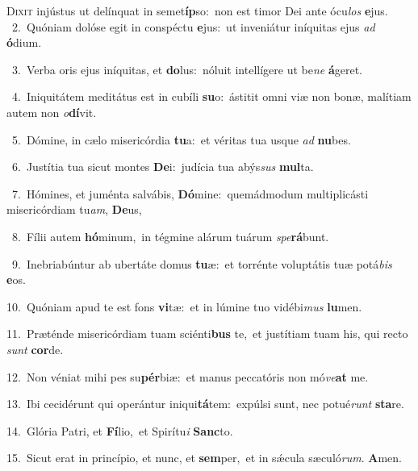 \lettrine{\initial\textcolor{\initialcolor}{D}}{ixit} injústus ut delínquat in semet\-\textbf{íp}\-so:~\star non est timor Dei ante ócu\textit{los} \textbf{e}\-jus.\\
{\numbfont\textcolor{\numbcolor}{~2.}}~Quóniam dolóse egit in conspéctu \textbf{e}\-jus:~\star ut inveniátur iníquitas ejus \textit{ad} \textbf{ó}\-dium.\par
{\numbfont\textcolor{\numbcolor}{~3.}}~Verba oris ejus iníquitas, et \textbf{do}\-lus:~\star nóluit intellígere ut be\textit{ne} \textbf{á}\-geret.\par
{\numbfont\textcolor{\numbcolor}{~4.}}~Iniquitátem meditátus est in cubíli \textbf{su}\-o:~\star ástitit omni viæ non bonæ, malítiam autem non \textit{o}\-\textbf{dí}vit.\par
{\numbfont\textcolor{\numbcolor}{~5.}}~Dómine, in cælo misericórdia \textbf{tu}\-a:~\star et véritas tua usque \textit{ad} \textbf{nu}\-bes.\par
{\numbfont\textcolor{\numbcolor}{~6.}}~Justítia tua sicut montes \textbf{De}\-i:~\star judícia tua abýs\textit{sus} \textbf{mul}\-ta.\par
{\numbfont\textcolor{\numbcolor}{~7.}}~Hómines, et juménta salvábis, \textbf{Dó}\-mine:~\star quemádmodum multiplicásti misericórdiam tu\-\textit{am}\-, \textbf{De}\-us,\par
{\numbfont\textcolor{\numbcolor}{~8.}}~Fílii autem \textbf{hó}\-minum,~\star in tégmine alárum tuárum \textit{spe}\-\textbf{rá}bunt.\par
{\numbfont\textcolor{\numbcolor}{~9.}}~Inebriabúntur ab ubertáte domus \textbf{tu}\-æ:~\star et torrénte voluptátis tuæ potá\textit{bis} \textbf{e}\-os.\par
{\numbfont\textcolor{\numbcolor}{10.}}~Quóniam apud te est fons \textbf{vi}\-tæ:~\star et in lúmine tuo vidébi\textit{mus} \textbf{lu}\-men.\par
{\numbfont\textcolor{\numbcolor}{11.}}~Præténde misericórdiam tuam sciénti\textbf{bus} te,~\star et justítiam tuam his, qui recto \textit{sunt} \textbf{cor}\-de.\par
{\numbfont\textcolor{\numbcolor}{12.}}~Non véniat mihi pes su\-\textbf{pér}\-biæ:~\star et manus peccatóris non mó\-\textit{ve}\-\textbf{at} me.\par
{\numbfont\textcolor{\numbcolor}{13.}}~Ibi cecidérunt qui operántur iniqui\-\textbf{tá}\-tem:~\star expúlsi sunt, nec potué\textit{runt} \textbf{sta}\-re.\par
{\numbfont\textcolor{\numbcolor}{14.}}~Glória Patri, et \textbf{Fí}\-lio,~\star et Spirítu\textit{i} \textbf{Sanc}\-to.\par
{\numbfont\textcolor{\numbcolor}{15.}}~Sicut erat in princípio, et nunc, et \textbf{sem}\-per,~\star et in sǽcula sæculó\-\textit{rum}\-. \textbf{A}\-men.\par
